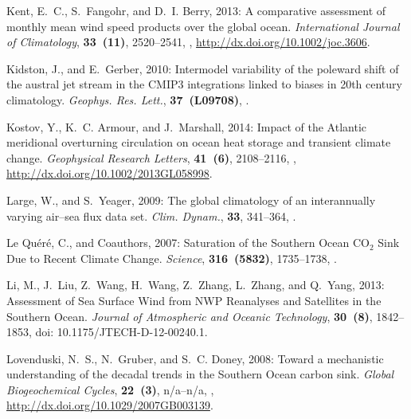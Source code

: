 \documentclass{ametsoc}
\begin{document}
\begin{thebibliography}{53}
Kent, E.~C., S.~Fangohr, and D.~I. Berry, 2013: {A comparative assessment of
  monthly mean wind speed products over the global ocean}.
  \textit{International Journal of Climatology}, \textbf{33~(11)}, 2520--2541,
  , \urlprefix\url{http://dx.doi.org/10.1002/joc.3606}.

Kidston, J., and E.~Gerber, 2010: {Intermodel variability of the poleward shift
  of the austral jet stream in the {CMIP3} integrations linked to biases in
  20th century climatology}. \textit{Geophys. {R}es. {L}ett.},
  \textbf{37~({L}09708)}, .

Kostov, Y., K.~C. Armour, and J.~Marshall, 2014: {Impact of the Atlantic
  meridional overturning circulation on ocean heat storage and transient
  climate change}. \textit{Geophysical Research Letters}, \textbf{41~(6)},
  2108--2116, ,
  \urlprefix\url{http://dx.doi.org/10.1002/2013GL058998}.

Large, W., and S.~Yeager, 2009: {The global climatology of an interannually
  varying air--sea flux data set}. \textit{Clim. Dynam.}, \textbf{33},
  341--364, .

{Le Qu{\'e}r{\'e}}, C., and Coauthors, 2007: {Saturation of the {S}outhern
  {O}cean {CO}$_2$ Sink Due to Recent Climate Change}. \textit{Science},
  \textbf{316~(5832)}, 1735--1738, .

Li, M., J.~Liu, Z.~Wang, H.~Wang, Z.~Zhang, L.~Zhang, and Q.~Yang, 2013:
  {Assessment of Sea Surface Wind from NWP Reanalyses and Satellites in the
  Southern Ocean}. \textit{Journal of Atmospheric and Oceanic Technology},
  \textbf{30~(8)}, 1842--1853, doi: 10.1175/JTECH-D-12-00240.1.

Lovenduski, N.~S., N.~Gruber, and S.~C. Doney, 2008: {Toward a mechanistic
  understanding of the decadal trends in the Southern Ocean carbon sink}.
  \textit{Global Biogeochemical Cycles}, \textbf{22~(3)}, n/a--n/a,
  ,
  \urlprefix\url{http://dx.doi.org/10.1029/2007GB003139}.


\end{thebibliography}
\end{document}
